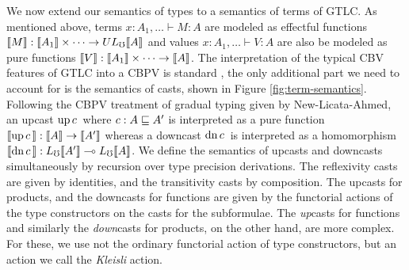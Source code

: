 We now extend our semantics of types to a semantics of terms of
GTLC. As mentioned above, terms $x:A_1,\ldots \vdash M : A$ are
modeled as effectful functions $\llbracket {M} \rrbracket: \llbracket {A_1} \rrbracket\times \cdots \to UL_\mho\llbracket {A} \rrbracket$
and values $x:A_1,\ldots \vdash V : A$ are also be modeled as pure
functions $\llbracket {V} \rrbracket : \llbracket {A_1} \rrbracket\times\cdots \to \llbracket {A} \rrbracket$.
%
The interpretation of the typical CBV features of GTLC into a CBPV is
standard \cite{levy}, the only additional part we need to account for
is the semantics of casts, shown in Figure \ref{fig:term-semantics}.
%
%
Following the CBPV treatment of gradual typing given by
New-Licata-Ahmed, an upcast $\text{up}\,{c}\,$ where $c : A \sqsubseteq A'$ is
interpreted as a pure function $\llbracket {\text{up}\,{c}\,} \rrbracket :\llbracket {A} \rrbracket \to \llbracket {A'} \rrbracket$ whereas a
downcast $\text{dn}\,{c}\,$ is interpreted as a homomorphism $\llbracket {\text{dn}\,{c}\,} \rrbracket :
L_\mho\llbracket {A'} \rrbracket \multimap L_\mho\llbracket {A} \rrbracket$.
We define the semantics of upcasts and downcasts simultaneously by
recursion over type precision derivations.
%
The reflexivity casts are given by identities, and the transitivity
casts by composition. The upcasts for products, and the downcasts for
functions are given by the functorial actions of the type constructors
on the casts for the subformulae.
%
The \emph{up}casts for functions and similarly the \emph{down}casts
for products, on the other hand, are more complex.
%
For these, we use not the ordinary functorial action of type
constructors, but an action we call the \emph{Kleisli} action.

